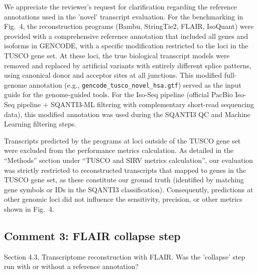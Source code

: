 \documentclass[11pt]{article}
\begin{document}
\begin{responseboxnew}
We appreciate the reviewer's request for clarification regarding the reference annotations used in the 'novel' transcript evaluation. For the benchmarking in Fig.~4, the reconstruction programs (Bambu, StringTie2, FLAIR, IsoQuant) were provided with a comprehensive reference annotation that included all genes and isoforms in GENCODE, with a specific modification restricted to the loci in the TUSCO gene set. At these loci, the true biological transcript models were removed and replaced by artificial variants with entirely different splice patterns, using canonical donor and acceptor sites at all junctions. This modified full-genome annotation (e.g., \texttt{gencode\_tusco\_novel\_hsa.gtf}) served as the input guide for the genome-guided tools. For the Iso-Seq pipeline (official PacBio Iso-Seq pipeline + SQANTI3-ML filtering with complementary short-read sequencing data), this modified annotation was used during the SQANTI3 QC and Machine Learning filtering steps.

Transcripts predicted by the programs at loci outside of the TUSCO gene set were excluded from the performance metrics calculation. As detailed in the ``Methods'' section under ``TUSCO and SIRV metrics calculation'', our evaluation was strictly restricted to reconstructed transcripts that mapped to genes in the TUSCO gene set, as these constitute our ground truth (identified by matching gene symbols or IDs in the SQANTI3 classification). Consequently, predictions at other genomic loci did not influence the sensitivity, precision, or other metrics shown in Fig.~4.
\end{responseboxnew}

\subsection{Comment 3: FLAIR collapse step}

\begin{reviewercomment}
Section 4.3, Transcriptome reconstruction with FLAIR. Was the 'collapse' step run with or without a reference annotation?
\end{reviewercomment}
\end{document}
